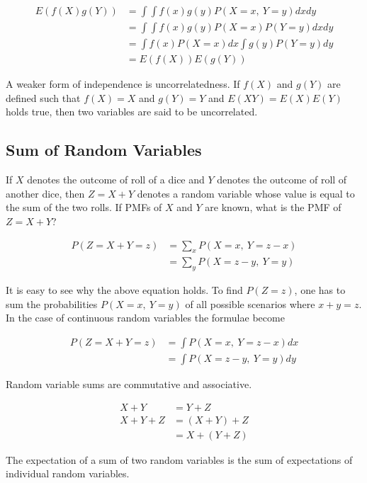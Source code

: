 \documentclass[11pt, a4paper]{article}
\begin{document}
\begin{align*}
	E(f(X)g(Y)) & = \int \int f(x)g(y)P(X=x,\ Y=y)dxdy      \\ 
	            & = \int \int f(x)g(y) P(X=x) P(Y=y) dxdy   \\
	            & = \int f(x) P(X=x) dx \int g(y) P(Y=y) dy \\
	            & = E(f(X))E(g(Y))                          
\end{align*}

A weaker form of independence is uncorrelatedness. If $f(X)$ and $g(Y)$ are defined such that $f(X)=X$ and $g(Y) = Y$ and $E(XY) = E(X)E(Y)$ holds true, then two variables are said to be uncorrelated.

\subsection {Sum of Random Variables}

If $X$ denotes the outcome of roll of a dice and $Y$ denotes the outcome of roll of another dice, then $Z=X+Y$ denotes a random variable whose value is equal to the sum of the two rolls. If PMFs of $X$ and $Y$ are known, what is the PMF of $Z=X+Y$?

\begin{align*}
	P(Z=X+Y=z) & = \sum_x P(X=x,\ Y=z-x) \\
	           & = \sum_y P(X=z-y,\ Y=y) 
\end{align*}

It is easy to see why the above equation holds. To find $P(Z=z)$, one has to sum the probabilities $P(X=x,\ Y=y)$ of all possible scenarios where $x+y=z$. In the case of continuous random variables the formulae become

\begin{align*}
	P(Z=X+Y=z) & = \int P(X=x,\ Y=z-x) dx \\
	           & = \int P(X=z-y,\ Y=y) dy 
\end{align*}

Random variable sums are commutative and associative.

\begin{align*}
	X + Y     & = Y + Z       \\
	X + Y + Z & = (X + Y) + Z \\
	          & = X + (Y + Z) 
\end{align*}

The expectation of a sum of two random variables is the sum of expectations of individual random variables.
\end{document}
